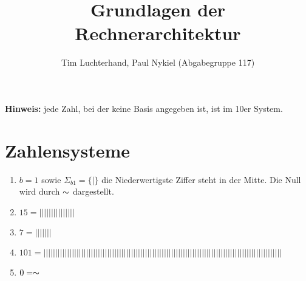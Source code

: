 \documentclass[DIN, pagenumber=false, fontsize=11pt, parskip=half]{scrartcl}
\title{Grundlagen der Rechnerarchitektur}
\author{Tim Luchterhand, Paul Nykiel (Abgabegruppe 117)}
\begin{document}
    \maketitle
    \textbf{Hinweis: } jede Zahl, bei der keine Basis angegeben ist, ist im 10er System.
    \section{Zahlensysteme}
    \begin{enumerate}
        \item  $b = 1$ sowie $\Sigma_{b1} = \{|\}$ die Niederwertigste Ziffer steht in der Mitte. Die Null wird durch $\thicksim$ dargestellt.
        \item $15 = ||||| ||||| |||||$
        \item $7 = || |||||$
        \item $101 = | 
            ||||| ||||| 
            ||||| ||||| 
            ||||| ||||| 
            ||||| ||||| 
            ||||| ||||| 
            ||||| ||||| 
            ||||| ||||| 
            ||||| ||||| 
            ||||| ||||| 
            ||||| |||||$
        \item $0 = \thicksim$
    \end{enumerate}
\end{document}

